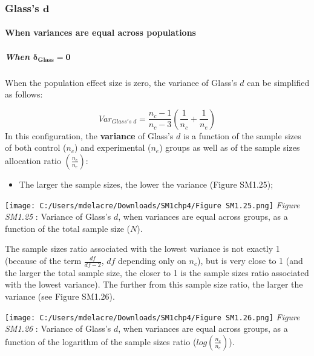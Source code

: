 \documentclass[
  english,
  man,mask,floatsintext]{apa6}
\providecommand{\tightlist}{%
  \setlength{\itemsep}{0pt}\setlength{\parskip}{0pt}}
\let\oldparagraph\paragraph
\renewcommand{\paragraph}[1]{\oldparagraph{#1}\mbox{}}
\let\oldsubparagraph\subparagraph
\renewcommand{\subparagraph}[1]{\oldsubparagraph{#1}\mbox{}}
\begin{document}
\hypertarget{glasss-bmd}{%
\subsubsection{\texorpdfstring{Glass's \(\bm{d}\)}{Glass's \textbackslash bm\{d\}}}\label{glasss-bmd}}

\hypertarget{when-variances-are-equal-across-populations-3}{%
\paragraph{When variances are equal across populations}\label{when-variances-are-equal-across-populations-3}}

\hypertarget{when-bmdelta_glass0}{%
\subparagraph{\texorpdfstring{When \(\bm{\delta_{Glass}=0}\)}{When \textbackslash bm\{\textbackslash delta\_\{Glass\}=0\}}}\label{when-bmdelta_glass0}}

When the population effect size is zero, the variance of Glass's \(d\) can be simplified as follows:

\[Var_{Glass's \; d} = \frac{n_c-1}{n_c-3} \left( \frac{1}{n_c}+\frac{1}{n_e}\right)\] In this configuration, the \textbf{variance} of Glass's \(d\) is a function of the sample sizes of both control (\(n_c\)) and experimental (\(n_e\)) groups as well as of the sample sizes allocation ratio \(\left( \frac{n_c}{n_e}\right)\):

\begin{itemize}
\tightlist
\item
  The larger the sample sizes, the lower the variance (Figure SM1.25);
\end{itemize}

\texttt{[image: C:/Users/mdelacre/Downloads/SM1chp4/Figure SM1.25.png]}
\emph{Figure SM1.25} : Variance of Glass's \(d\), when variances are equal across groups, as a function of the total sample size (\(N\)).

The sample sizes ratio associated with the lowest variance is not exactly 1 (because of the term \(\frac{df}{df-2}\), \(df\) depending only on \(n_c\)), but is very close to 1 (and the larger the total sample size, the closer to 1 is the sample sizes ratio associated with the lowest variance). The further from this sample size ratio, the larger the variance (see Figure SM1.26).

\texttt{[image: C:/Users/mdelacre/Downloads/SM1chp4/Figure SM1.26.png]}
\emph{Figure SM1.26} : Variance of Glass's \(d\), when variances are equal across groups, as a function of the logarithm of the sample sizes ratio (\(log\left(\frac{n_c}{n_e} \right)\)).
\end{document}
